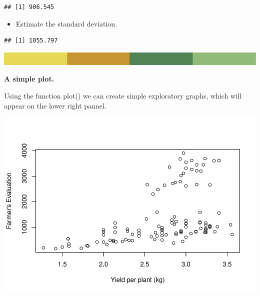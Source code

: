 \documentclass[
]{book}
\newenvironment{Shaded}{\begin{snugshade}}{\end{snugshade}}
\newcommand{\AttributeTok}[1]{\textcolor[rgb]{0.77,0.63,0.00}{#1}}
\newcommand{\CommentTok}[1]{\textcolor[rgb]{0.56,0.35,0.01}{\textit{#1}}}
\newcommand{\FunctionTok}[1]{\textcolor[rgb]{0.00,0.00,0.00}{#1}}
\newcommand{\NormalTok}[1]{#1}
\newcommand{\SpecialCharTok}[1]{\textcolor[rgb]{0.00,0.00,0.00}{#1}}
\newcommand{\StringTok}[1]{\textcolor[rgb]{0.31,0.60,0.02}{#1}}
\providecommand{\tightlist}{%
  \setlength{\itemsep}{0pt}\setlength{\parskip}{0pt}}
\begin{document}
\begin{verbatim}
## [1] 906.545
\end{verbatim}

\begin{itemize}
\tightlist
\item
  Estimate the standard deviation.
\end{itemize}

\begin{Shaded}
\end{Shaded}

\begin{verbatim}
## [1] 1055.797
\end{verbatim}

\includegraphics{rsrstrip.png}

\textbf{A simple plot.}

Using the function plot() we can create simple exploratory graphs, which will appear on the lower right pannel.

\begin{Shaded}
\end{Shaded}

\includegraphics{PPB-Toolkit-for-R-and-R-Studio_files/figure-latex/unnamed-chunk-33-1.pdf}
\end{document}
